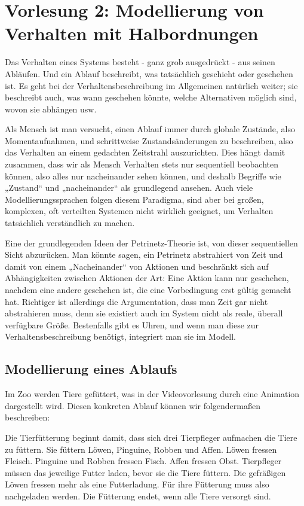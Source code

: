 \section{Vorlesung 2: Modellierung von Verhalten mit Halbordnungen}

Das Verhalten eines Systems besteht - ganz grob ausgedrückt - aus seinen Abläufen. Und ein Ablauf beschreibt, was tatsächlich geschieht oder geschehen ist. Es geht bei der Verhaltensbeschreibung im Allgemeinen natürlich weiter; sie beschreibt auch, was wann geschehen könnte, welche Alternativen möglich sind, wovon sie abhängen usw.

Als Mensch ist man versucht, einen Ablauf immer durch globale Zustände, also Momentaufnahmen, und schrittweise Zustandsänderungen zu beschreiben, also das Verhalten an einem gedachten Zeitstrahl auszurichten. Dies hängt damit zusammen, dass wir als Mensch Verhalten stets nur sequentiell beobachten können, also alles nur nacheinander sehen können, und deshalb Begriffe wie „Zustand“ und „nacheinander“ als grundlegend ansehen. Auch viele Modellierungssprachen folgen diesem Paradigma, sind aber bei großen, komplexen, oft verteilten Systemen nicht wirklich geeignet, um Verhalten tatsächlich verständlich zu machen.

Eine der grundlegenden Ideen der Petrinetz-Theorie ist, 
von dieser sequentiellen Sicht abzurücken. Man könnte sagen, ein Petrinetz abstrahiert von Zeit und damit von einem „Nacheinander“ von Aktionen und beschränkt sich auf Abhängigkeiten zwischen Aktionen der Art: Eine Aktion kann nur geschehen, nachdem eine andere geschehen ist, die eine Vorbedingung erst gültig gemacht hat. Richtiger ist allerdings die Argumentation, dass man Zeit gar nicht abstrahieren muss, denn sie existiert auch im System nicht als reale, überall verfügbare Größe. Bestenfalls gibt es Uhren, und wenn man diese zur Verhaltensbeschreibung benötigt, integriert man sie im Modell.

\subsection*{Modellierung eines Ablaufs}

Im Zoo werden Tiere gefüttert, 
was in der Videovorlesung durch eine Animation dargestellt wird. Diesen konkreten Ablauf können wir folgendermaßen beschreiben:

\begin{addmargin}[25pt]{25pt}
	Die Tierfütterung beginnt damit, dass sich drei Tierpfleger aufmachen die Tiere zu füttern. Sie füttern Löwen, Pinguine, Robben und Affen. Löwen fressen Fleisch. Pinguine und Robben fressen Fisch. Affen fressen Obst. Tierpfleger müssen das jeweilige Futter laden, bevor sie die Tiere füttern. Die gefräßigen Löwen fressen mehr als eine Futterladung. Für ihre Fütterung muss also nachgeladen werden. Die Fütterung endet, wenn alle Tiere versorgt sind.
\end{addmargin}

